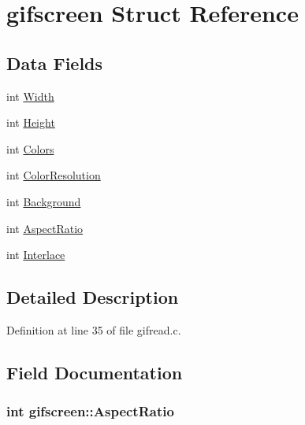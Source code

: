 \hypertarget{structgifscreen}{\section{gifscreen Struct Reference}
\label{structgifscreen}
}
\subsection*{Data Fields}
\begin{DoxyCompactItemize}
\item 
int \hyperlink{structgifscreen_a3079f5759d42a6edb5720f143dac5e97}{Width}
\item 
int \hyperlink{structgifscreen_aa7f3a15b810a394cb1d01ac5d10d325b}{Height}
\item 
int \hyperlink{structgifscreen_aa0d1897afb3181c6ae9b2130b36ca8d9}{Colors}
\item 
int \hyperlink{structgifscreen_a207d54592bfe37394a84e98603d6936f}{Color\+Resolution}
\item 
int \hyperlink{structgifscreen_aaeadb14e663211655fd7d2a160b288c0}{Background}
\item 
int \hyperlink{structgifscreen_acab49d23a20a86d86038bde8ce879b2b}{Aspect\+Ratio}
\item 
int \hyperlink{structgifscreen_a04416bc477001625456cccef080acab7}{Interlace}
\end{DoxyCompactItemize}


\subsection{Detailed Description}


Definition at line 35 of file gifread.\+c.



\subsection{Field Documentation}
\hypertarget{structgifscreen_acab49d23a20a86d86038bde8ce879b2b}{
\subsubsection[{Aspect\+Ratio}]{\setlength{\rightskip}{0pt plus 5cm}int gifscreen\+::\+Aspect\+Ratio}}\label{structgifscreen_acab49d23a20a86d86038bde8ce879b2b}


